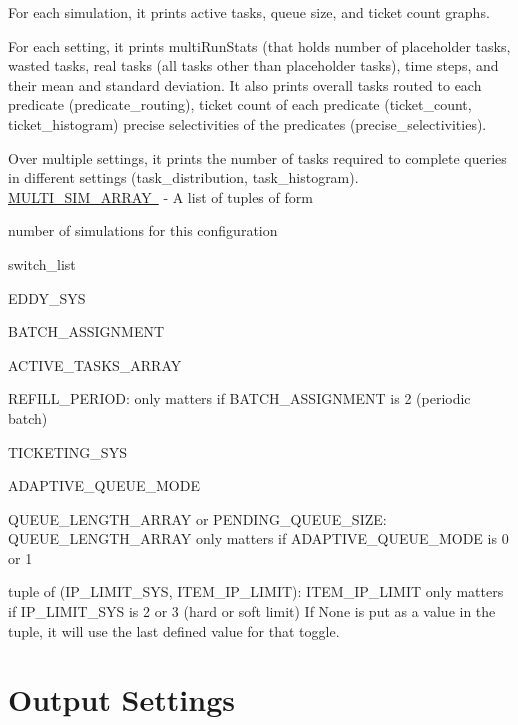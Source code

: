 \begin{DoxyItemize}
\item For each simulation, it prints active tasks, queue size, and ticket count graphs.
\item For each setting, it prints multi\+Run\+Stats (that holds number of placeholder tasks, wasted tasks, real tasks (all tasks other than placeholder tasks), time steps, and their mean and standard deviation. It also prints overall tasks routed to each predicate (predicate\+\_\+routing), ticket count of each predicate (ticket\+\_\+count, ticket\+\_\+histogram) precise selectivities of the predicates (precise\+\_\+selectivities).
\item Over multiple settings, it prints the number of tasks required to complete queries in different settings (task\+\_\+distribution, task\+\_\+histogram). ~\newline
 \mbox{\hyperlink{namespacedynamicfilterapp_1_1toggles_a220d8cf87bacce3b4d63c494c95b918e}{M\+U\+L\+T\+I\+\_\+\+S\+I\+M\+\_\+\+A\+R\+R\+AY }} -\/ A list of tuples of form
\item number of simulations for this configuration
\item switch\+\_\+list
\item E\+D\+D\+Y\+\_\+\+S\+YS
\item B\+A\+T\+C\+H\+\_\+\+A\+S\+S\+I\+G\+N\+M\+E\+NT
\item A\+C\+T\+I\+V\+E\+\_\+\+T\+A\+S\+K\+S\+\_\+\+A\+R\+R\+AY
\item R\+E\+F\+I\+L\+L\+\_\+\+P\+E\+R\+I\+OD\+: only matters if B\+A\+T\+C\+H\+\_\+\+A\+S\+S\+I\+G\+N\+M\+E\+NT is 2 (periodic batch)
\item T\+I\+C\+K\+E\+T\+I\+N\+G\+\_\+\+S\+YS
\item A\+D\+A\+P\+T\+I\+V\+E\+\_\+\+Q\+U\+E\+U\+E\+\_\+\+M\+O\+DE
\item Q\+U\+E\+U\+E\+\_\+\+L\+E\+N\+G\+T\+H\+\_\+\+A\+R\+R\+AY or P\+E\+N\+D\+I\+N\+G\+\_\+\+Q\+U\+E\+U\+E\+\_\+\+S\+I\+ZE\+: Q\+U\+E\+U\+E\+\_\+\+L\+E\+N\+G\+T\+H\+\_\+\+A\+R\+R\+AY only matters if A\+D\+A\+P\+T\+I\+V\+E\+\_\+\+Q\+U\+E\+U\+E\+\_\+\+M\+O\+DE is 0 or 1
\item tuple of (I\+P\+\_\+\+L\+I\+M\+I\+T\+\_\+\+S\+YS, I\+T\+E\+M\+\_\+\+I\+P\+\_\+\+L\+I\+M\+IT)\+: I\+T\+E\+M\+\_\+\+I\+P\+\_\+\+L\+I\+M\+IT only matters if I\+P\+\_\+\+L\+I\+M\+I\+T\+\_\+\+S\+YS is 2 or 3 (hard or soft limit) If None is put as a value in the tuple, it will use the last defined value for that toggle.
\end{DoxyItemize}\hypertarget{toggles_output}{}\section{Output Settings}\label{toggles_output}

